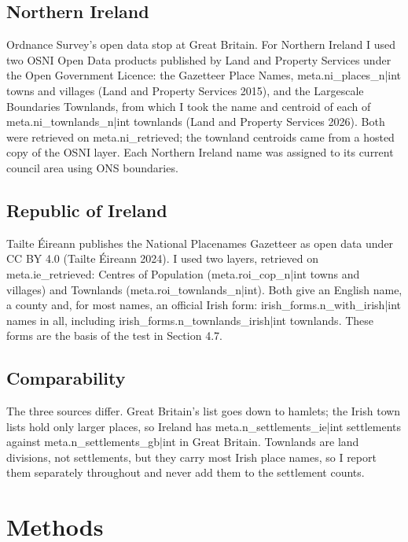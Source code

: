 \documentclass[11pt,a4paper]{article}
\begin{document}
\subsection{Northern Ireland}

Ordnance Survey's open data stop at Great Britain. For Northern Ireland I used two OSNI Open Data products published by Land and Property Services under the Open Government Licence: the Gazetteer Place Names, {{meta.ni_places_n|int}} towns and villages (Land and Property Services 2015), and the Largescale Boundaries Townlands, from which I took the name and centroid of each of {{meta.ni_townlands_n|int}} townlands (Land and Property Services 2026). Both were retrieved on {{meta.ni_retrieved}}; the townland centroids came from a hosted copy of the OSNI layer. Each Northern Ireland name was assigned to its current council area using ONS boundaries.

\subsection{Republic of Ireland}

Tailte Éireann publishes the National Placenames Gazetteer as open data under CC BY 4.0 (Tailte Éireann 2024). I used two layers, retrieved on {{meta.ie_retrieved}}: Centres of Population ({{meta.roi_cop_n|int}} towns and villages) and Townlands ({{meta.roi_townlands_n|int}}). Both give an English name, a county and, for most names, an official Irish form: {{irish_forms.n_with_irish|int}} names in all, including {{irish_forms.n_townlands_irish|int}} townlands. These forms are the basis of the test in Section 4.7.

\subsection{Comparability}

The three sources differ. Great Britain's list goes down to hamlets; the Irish town lists hold only larger places, so Ireland has {{meta.n_settlements_ie|int}} settlements against {{meta.n_settlements_gb|int}} in Great Britain. Townlands are land divisions, not settlements, but they carry most Irish place names, so I report them separately throughout and never add them to the settlement counts.

\section{Methods}
\end{document}

